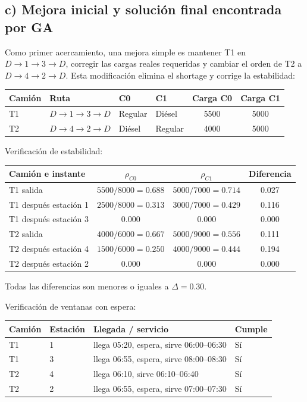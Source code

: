 \documentclass[11pt,letterpaper]{article}
\begin{document}
\subsection{c) Mejora inicial y solución final encontrada por GA}

Como primer acercamiento, una mejora simple es mantener T1 en \(D\to1\to3\to D\),
corregir las cargas reales requeridas y cambiar el orden de T2 a \(D\to4\to2\to D\).
Esta modificación elimina el shortage y corrige la estabilidad:

\begin{table}[h]
\centering
\begin{tabular}{llllcc}
\toprule
\textbf{Camión} & \textbf{Ruta} & \textbf{C0} & \textbf{C1} & \textbf{Carga C0} & \textbf{Carga C1} \\
\midrule
T1 & \(D\to1\to3\to D\) & Regular & Diésel & 5500 & 5000 \\
T2 & \(D\to4\to2\to D\) & Diésel & Regular & 4000 & 5000 \\
\bottomrule
\end{tabular}
\end{table}

Verificación de estabilidad:

\begin{table}[h]
\centering
\begin{tabular}{lccc}
\toprule
\textbf{Camión e instante} & \(\rho_{C0}\) & \(\rho_{C1}\) & \textbf{Diferencia} \\
\midrule
T1 salida & \(5500/8000=0.688\) & \(5000/7000=0.714\) & 0.027 \\
T1 después estación 1 & \(2500/8000=0.313\) & \(3000/7000=0.429\) & 0.116 \\
T1 después estación 3 & 0.000 & 0.000 & 0.000 \\
T2 salida & \(4000/6000=0.667\) & \(5000/9000=0.556\) & 0.111 \\
T2 después estación 4 & \(1500/6000=0.250\) & \(4000/9000=0.444\) & 0.194 \\
T2 después estación 2 & 0.000 & 0.000 & 0.000 \\
\bottomrule
\end{tabular}
\end{table}

Todas las diferencias son menores o iguales a \(\Delta=0.30\).

Verificación de ventanas con espera:

\begin{table}[h]
\centering
\begin{tabular}{llll}
\toprule
\textbf{Camión} & \textbf{Estación} & \textbf{Llegada / servicio} & \textbf{Cumple} \\
\midrule
T1 & 1 & llega 05:20, espera, sirve 06:00--06:30 & Sí \\
T1 & 3 & llega 06:55, espera, sirve 08:00--08:30 & Sí \\
T2 & 4 & llega 06:10, sirve 06:10--06:40 & Sí \\
T2 & 2 & llega 06:55, espera, sirve 07:00--07:30 & Sí \\
\bottomrule
\end{tabular}
\end{table}
\end{document}
